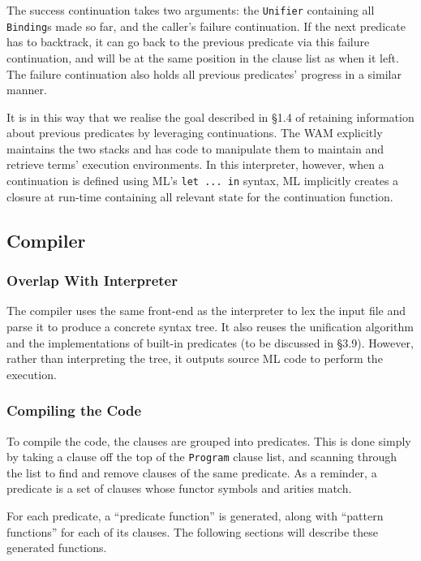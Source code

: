 \documentclass[12pt]{article}
\begin{document}
The success continuation takes two arguments: the \verb|Unifier| containing all \verb|Binding|s made so far, and the caller's failure continuation. 
If the next predicate has to backtrack, it can go back to the previous predicate via this failure continuation, and will be at the same position in the clause list as when it left. 
The failure continuation also holds all previous predicates' progress in a similar manner.

It is in this way that we realise the goal described in \S1.4 of retaining information about previous predicates by leveraging continuations.
The WAM explicitly maintains the two stacks and has code to manipulate them to maintain and retrieve terms' execution environments. 
In this interpreter, however, when a continuation is defined using ML's \verb|let ... in| syntax, ML implicitly creates a closure at run-time containing all relevant state for the continuation function.

\subsection{Compiler}

\subsubsection{Overlap With Interpreter}

The compiler uses the same front-end as the interpreter to lex the input file and parse it to produce a concrete syntax tree. 
It also reuses the unification algorithm and the implementations of built-in predicates (to be discussed in \S3.9). 
However, rather than interpreting the tree, it outputs source ML code to perform the execution.

\subsubsection{Compiling the Code}

To compile the code, the clauses are grouped into predicates. 
This is done simply by taking a clause off the top of the \verb|Program| clause list, and scanning through the list to find and remove clauses of the same predicate. 
As a reminder, a predicate is a set of clauses whose functor symbols and arities match.

For each predicate, a ``predicate function'' is generated, along with ``pattern functions'' for each of its clauses. 
The following sections will describe these generated functions.
\end{document}
